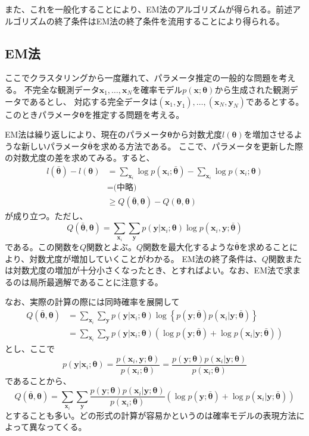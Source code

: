 \documentclass[9pt,draft,twocolumn]{jsarticle}
\newcommand{\bmx}{{\bm{x}}}
\newcommand{\bmy}{{\bm{y}}}
\newcommand{\bmt}{{\bm\theta}}
\newcommand{\bmtb}{\bar\bmt}
\begin{document}
また、これを一般化することにより、EM法のアルゴリズムが得られる。前述アルゴリズムの終了条件はEM法の終了条件を流用することにより得られる。

\subsection{EM法}
ここでクラスタリングから一度離れて、パラメータ推定の一般的な問題を考える。
不完全な観測データ$\bm{x}_1,\ldots,\bm{x}_N$を確率モデル$p(\bm
x;\bm\theta)$から生成された観測データであるとし、 対応する完全データは$(\bm{x}_1,\bm{y}_1),\ldots,(\bm{x}_N,\bm{y}_N)$であるとする。
このときパラメータ$\bm{\theta}$を推定する問題を考える。

EM法は繰り返しにより、現在のパラメータ$\bm\theta$から対数尤度$l(\bm\theta)$を増加させるような新しいパラメータ$\bar{\bm\theta}$を求める方法である。
ここで、パラメータを更新した際の対数尤度の差を求めてみる。すると、
\[
\begin{split}
l(\bar{\bm\theta}) - l(\bm\theta) &= \sum_{\bm{x}_i} \log p(\bm x_i;\bmtb)
	- \sum_{\bm x_i} \log p(\bm x_i;\bmt) \\
	&= \text{(中略)} \\
	&\ge Q(\bmtb,\bmt) -Q(\bmt,\bmt)
\end{split}
\]
が成り立つ。ただし、
\[ Q(\bmtb,\bmt) = \sum_{\bm x_i} \sum_\bmy p(\bmy | \bmx_i ;\bmt) \log p(\bmx_i,\bmy;\bmtb) \]
である。この関数を$Q$関数とよぶ。$Q$関数を最大化するような$\bmtb$を求めることにより、対数尤度が増加していくことがわかる。
EM法の終了条件は、$Q$関数または対数尤度の増加が十分小さくなったとき、とすればよい。なお、EM法で求まるのは局所最適解であることに注意する。

なお、実際の計算の際には同時確率を展開して
\[
\begin{split}
Q(\bmtb,\bmt) &= \sum_{\bm x_i} \sum_\bmy p(\bmy | \bmx_i ;\bmt) 
	\log \left\{ p(\bmy;\bmtb) p(\bmx_i|\bmy;\bmtb) \right\} \\
&= \sum_{\bm x_i} \sum_\bmy p(\bmy | \bmx_i ;\bmt) 
	( \log p(\bmy;\bmtb) + \log p(\bmx_i|\bmy;\bmtb) )
\end{split} 
\]
とし、ここで
\[
p(\bmy | \bmx_i ;\bmt) = \frac{p(\bmx_i,\bmy ;\bmt)}{p(\bmx_i ;\bmt)}
= \frac{p(\bmy;\bmt) p(\bmx_i|\bmy ;\bmt)}{p(\bmx_i ;\bmt)}
\]
であることから、
\[
Q(\bmtb,\bmt) = \sum_{\bm x_i} \sum_\bmy 
\frac{p(\bmy;\bmt) p(\bmx_i|\bmy ;\bmt)}{p(\bmx_i ;\bmt)}
	( \log p(\bmy;\bmtb) + \log p(\bmx_i|\bmy;\bmtb) )
\]
とすることも多い。どの形式の計算が容易かというのは確率モデルの表現方法によって異なってくる。
\end{document}
